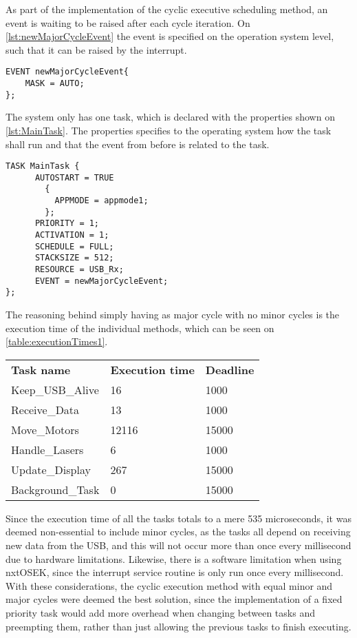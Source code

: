 As part of the implementation of the cyclic executive scheduling method, an event is waiting to be raised after each cycle iteration.
On \autoref{lst:newMajorCycleEvent} the event is specified on the operation system level, such that it can be raised by the interrupt.
\begin{lstlisting}[language=CSharp,label={lst:newMajorCycleEvent},caption={newMajorCycleEvent event from nxt.oil}]
EVENT newMajorCycleEvent{
    MASK = AUTO;
};
\end{lstlisting}

The system only has one task, which is declared with the properties shown on \autoref{lst:MainTask}.
The properties specifies to the operating system how the task shall run and that the event from before is related to the task.
\begin{lstlisting}[language=CSharp,label={lst:MainTaskoil},caption={MainTaks task from nxt.oil}]
    TASK MainTask {
      AUTOSTART = TRUE
        {
          APPMODE = appmode1;
        };
      PRIORITY = 1;
      ACTIVATION = 1;
      SCHEDULE = FULL;
      STACKSIZE = 512;
      RESOURCE = USB_Rx;
      EVENT = newMajorCycleEvent;
};
\end{lstlisting}

The reasoning behind simply having as major cycle with no minor cycles is the execution time of the individual methods, which can be seen on \autoref{table:executionTimes1}.

\begin{table}[H]
\begin{tabular}{lll}
\textbf{Task name}  & \textbf{Execution time} & \textbf{Deadline} \\
Keep\_USB\_Alive    & 16     	& 1000                    \\
Receive\_Data       & 13       & 1000                    \\
Move\_Motors        & 12116    & 15000                   \\
Handle\_Lasers      & 6        & 1000                    \\
Update\_Display     & 267      & 15000                   \\
Background\_Task	 & 0	    & 15000					   \\
\end{tabular}
\end{table}\label{table:executionTimes1}

Since the execution time of all the tasks totals to a mere 535 microseconds, it was deemed non-essential to include minor cycles, as the tasks all depend on receiving new data from the USB, and this will not occur more than once every millisecond due to hardware limitations.
Likewise, there is a software limitation when using nxtOSEK, since the interrupt service routine is only run once every millisecond.
With these considerations, the cyclic execution method with equal minor and major cycles were deemed the best solution, since the implementation of a fixed priority task would add more overhead when changing between tasks and preempting them, rather than just allowing the previous tasks to finish executing.

